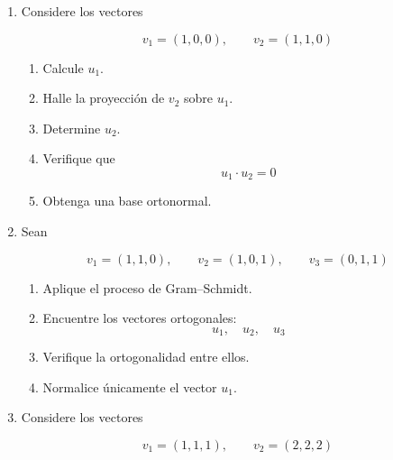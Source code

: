 \documentclass[12pt,letterpaper]{article}
\begin{document}
\begin{enumerate}[label=\textbf{\arabic*.}]
\begin{enumerate}[label=\alph*)]
\end{enumerate}

\vspace{0.5cm}

\item Considere los vectores

\[
v_1=(1,0,0),
\qquad
v_2=(1,1,0)
\]

\begin{enumerate}[label=\alph*)]

\item Calcule \(u_1\).

\item Halle la proyección de \(v_2\) sobre \(u_1\).

\item Determine \(u_2\).

\item Verifique que
\[
u_1\cdot u_2=0
\]

\item Obtenga una base ortonormal.

\end{enumerate}

\vspace{0.5cm}

\item Sean

\[
v_1=(1,1,0),
\qquad
v_2=(1,0,1),
\qquad
v_3=(0,1,1)
\]

\begin{enumerate}[label=\alph*)]

\item Aplique el proceso de Gram--Schmidt.

\item Encuentre los vectores ortogonales:
\[
u_1,\quad u_2,\quad u_3
\]

\item Verifique la ortogonalidad entre ellos.

\item Normalice únicamente el vector \(u_1\).

\end{enumerate}

\vspace{0.5cm}

\item Considere los vectores

\[
v_1=(1,1,1),
\qquad
v_2=(2,2,2)
\]


\end{enumerate}
\end{document}
